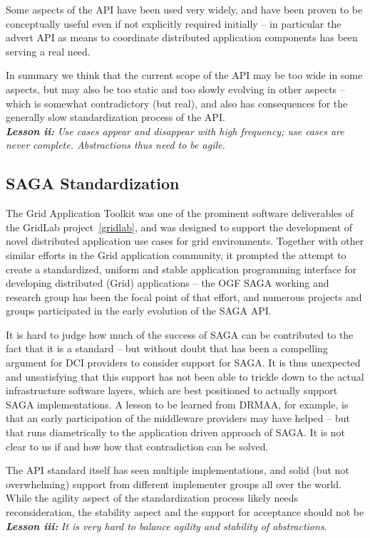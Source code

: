 \documentclass[]{article}
\newcommand{\I}[1]{\textit{#1}}
\newcommand{\BI}[1]{\textbf{\textit{#1}}}
\begin{document}
  Some aspects of the API have been used very widely, and have been
  proven to be conceptually useful even if not explicitly required
  initially -- in particular the advert API as means to coordinate
  distributed application components has been serving a real need.

  In summary we think that the current scope of the API may be too
  wide in some aspects, but may also be too static and too slowly
  evolving in other aspects -- which is somewhat contradictory (but
  real), and also has consequences for the generally slow
  standardization process of the API.\\
  \BI{Lesson ii:} \I{Use cases appear and disappear with high frequency;
  use cases are never complete.  Abstractions thus need to be agile.}


 \subsection{SAGA Standardization}

  The Grid Application Toolkit was one of the prominent software
  deliverables of the GridLab project~\ref{gridlab}, and was designed
  to support the development of novel distributed application use
  cases for grid environments.  Together with other similar efforts in
  the Grid application community, it prompted the attempt to create
  a standardized, uniform and stable application programming interface
  for developing distributed (Grid) applications -- the OGF SAGA
  working and research group has been the focal point of that effort,
  and numerous projects and groups participated in the early
  evolution of the SAGA API.  

  It is hard to judge how much of the success of SAGA can be
  contributed to the fact that it is a standard -- but without doubt
  that has been a compelling argument for DCI providers to consider
  support for SAGA.  It is thus unexpected and unsatisfying that this
  support has not been able to trickle down to the actual
  infrastructure software layers, which are best positioned to
  actually support SAGA implementations.  A lesson to be learned from
  DRMAA, for example, is that an early participation of the middleware
  providers may have helped -- but that runs diametrically to the
  application driven approach of SAGA.  It is not clear to us if and
  how how that contradiction can be solved.

  The API standard itself has seen multiple implementations, and solid
  (but not overwhelming) support from different implementer groups all
  over the world.  While the agility aspect of the standardization
  process likely needs reconsideration, the stability aspect and the
  support for acceptance should not be\\
  \BI{Lesson iii:} \I{It is very hard to balance agility and stability
  of abstractions.}
\end{document}
